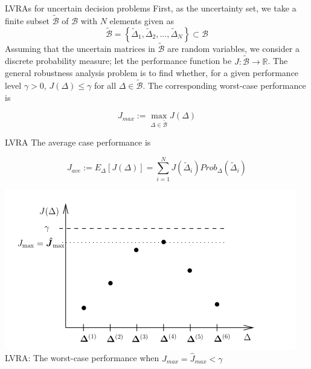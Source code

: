\documentclass[xcolor={dvipsnames}]{beamer}
\begin{document}
	\begin{frame}{LVRAs for uncertain decision problems}
        First, as the uncertainty set, we take a finite subset $\tilde{\mathscr{B}}$ of $\mathscr{B}$ with $N$ 
        elements given as
        \begin{equation*}
            \tilde{\mathscr{B}} = \left\{\tilde{\Delta}_1, \tilde{\Delta}_2, ..., \tilde{\Delta}_N\right\} 
            \subset \mathscr{B}
        \end{equation*}
        Assuming that the uncertain matrices in $\tilde{\mathscr{B}}$ are random variables,
        we consider a discrete probability measure; let the performance function 
        be $J : \tilde{\mathscr{B}} → \mathbb{R}$.
        The general robustness analysis problem is to find whether, for a given performance 
        level $\gamma > 0$, $J(\Delta) \leq \gamma$ for all $\Delta \in \tilde{\mathscr{B}}$. 
        The corresponding worst-case performance is
        \begin{alertblock}{}
            \begin{equation}
                J_{max} := \max_{\Delta \in \tilde{\mathscr{B}}}J(\Delta)
            \end{equation} 
        \end{alertblock}
        
    \end{frame}

	\begin{frame}{LVRA}
        The average case performance is
        \begin{alertblock}{}
            \begin{equation*}
                J_{ave} := E_\Delta\left[J(\Delta)\right] = \sum_{i=1}^N J(\tilde{\Delta}_i)Prob_\Delta(\tilde{\Delta}_i)
            \end{equation*}
        \end{alertblock}
        \begin{center}
            \includegraphics[width=0.49\linewidth]{2.png}
            LVRA: The worst-case performance when $J_{max} = \hat{J}_{max} < \gamma$
        \end{center}
    \end{frame}
\end{document}
